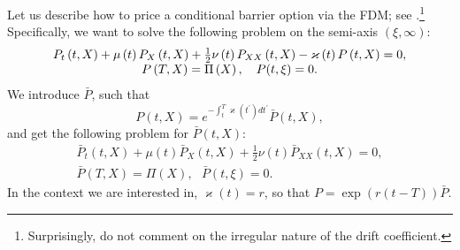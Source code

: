 \documentclass{article}
\begin{document}
Let us describe how to price a conditional barrier option via the FDM; see 
\cite{Loeper2009}.\footnote{%
Surprisingly, \cite{Loeper2009} do not comment on the irregular nature of
the drift coefficient.} Specifically, we want to solve the following problem
on the semi-axis $\left( \xi ,\infty \right) $:%
\begin{equation}
\begin{array}{c}
P_{t}\left( t,X\right) +\mu \left( t\right) P_{X}\left( t,X\right) +\frac{1}{%
2}\nu \left( t\right) P_{XX}\left( t,X\right) -\varkappa \left( t\right)
P\left( t,X\right) =0, \\ 
P\left( T,X\right) =\Pi \left( X\right) ,\ \ \ P(t,\xi )=0.%
\end{array}
\label{Eq45}
\end{equation}%
We introduce $\bar{P}$, such that%
\begin{equation}
P\left( t,X\right) =e^{-\int_{t}^{T}\varkappa \left( t^{\prime }\right)
dt^{\prime }}\bar{P}\left( t,X\right) ,  \label{Eq45a}
\end{equation}%
and get the following problem for $\bar{P}\left( t,X\right) $:%
\begin{equation}
\begin{array}{c}
\bar{P}_{t}\left( t,X\right) +\mu \left( t\right) \bar{P}_{X}\left(
t,X\right) +\frac{1}{2}\nu \left( t\right) \bar{P}_{XX}\left( t,X\right) =0,
\\ 
\bar{P}\left( T,X\right) =\Pi \left( X\right) ,\ \ \ \bar{P}(t,\xi )=0.%
\end{array}
\label{Eq45b}
\end{equation}%
In the context we are interested in, $\varkappa \left( t\right) =r$, so that 
$P=\exp \left( r\left( t-T\right) \right) \bar{P}$.
\end{document}
